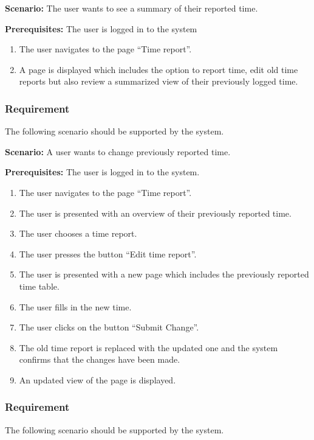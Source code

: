 \documentclass{article}
\begin{document}
\textbf{Scenario:} The user wants to see a summary of their reported time.

\textbf{Prerequisites:} The user is logged in to the system
\begin{enumerate}


\item The user navigates to the page “Time report”.
\item A page is displayed which includes the option to report time, edit old time reports but also review a summarized view of their previously logged time. 
\end{enumerate}

\subsubsection{Requirement}
The following scenario should be supported by the system.

\textbf{Scenario:} A user wants to change previously reported time.

\textbf{Prerequisites:} The user is logged in to the system.

\begin{enumerate}

\item The user navigates to the page “Time report”.
\item The user is presented with an overview of their previously reported time. 
\item The user chooses a time report.
\item The user presses the button “Edit time report”.
\item The user is presented with a new page which includes the previously reported time table. 
\item The user fills in the new time.
\item The user clicks on the button “Submit Change”.
\item The old time report is replaced with the updated one and the system confirms that the changes have been made.  
\item An updated view of the page is displayed.

\end{enumerate}

\subsubsection{Requirement}
The following scenario should be supported by the system.
\end{document}
